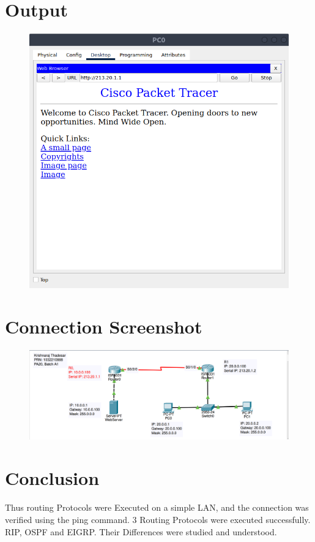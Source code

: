 \documentclass[11pt]{article}
\begin{document}
\section{Output}
\begin{figure}[H]
	\centering
	\includegraphics[scale=0.6]{../Screenshots/Natting web browser.png}
\end{figure}

\section{Connection Screenshot}


\begin{figure}[H]
	\centering
	\includegraphics[scale=0.4]{../Screenshots/Assignment_6_screenshot.png}
\end{figure}


\section{Conclusion}
Thus routing Protocols were Executed on a simple LAN, and the connection was verified using the ping command. 3 Routing Protocols were executed successfully. RIP, OSPF and EIGRP. Their Differences were studied and understood. 
\end{document}
